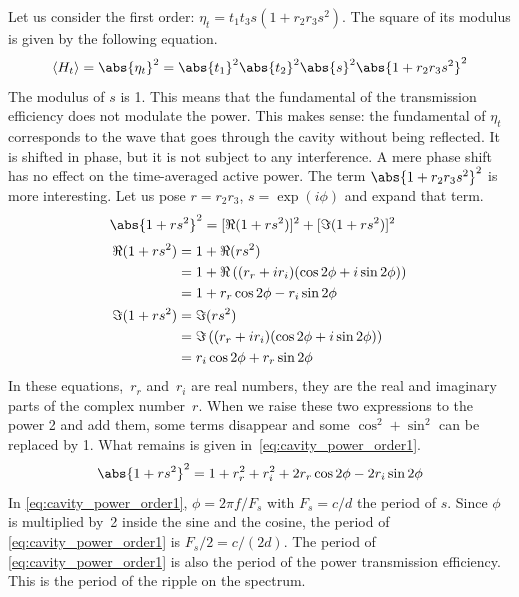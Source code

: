 Let us consider the first order: $\eta_t = t_1 t_3 s (1 + r_2 r_3 s^2)$.
The square of its modulus is given by the following equation.
\begin{equation}
    \langle H_t \rangle =
    \abs{\eta_t}^2 =
    \abs{t_1}^2 \abs{t_2}^2 \abs{s}^2 \abs{1 + r_2 r_3 s^2}^2
    \label{eq:Ht_expanded}
\end{equation}
The modulus of $s$ is 1.
This means that the fundamental of the transmission efficiency does not modulate the power.
This makes sense: the fundamental of $\eta_t$ corresponds to the wave that goes through the cavity without being reflected.
It is shifted in phase, but it is not subject to any interference.
A mere phase shift has no effect on the time-averaged active power.
The term $\abs{1 + r_2 r_3 s^2}^2$ is more interesting.
Let us pose $r=r_2 r_3$, $s=\exp(i\phi)$ and expand that term.
\begin{align}
    \abs{1 + r s^2}^2
    &=
    [\Re(1 + r s^2)]^2 + [\Im(1 + r s^2)]^2
\end{align}
\begin{align}
    \Re(1 + r s^2)
    &=
    1 + \Re(r s^2) \notag
    \\
    &=
    1 + \Re\left(
        (r_r + i r_i) (\cos 2\phi + i\sin 2\phi)
    \right) \notag
    \\
    &= 1 + r_r \cos 2\phi - r_i \sin 2\phi
    \\
    \Im(1 + r s^2)
    &=
    \Im(r s^2) \notag
    \\
    &=
    \Im\left(
        (r_r + i r_i) (\cos 2\phi + i\sin 2\phi)
    \right) \notag
    \\
    &= r_i \cos 2\phi + r_r \sin 2\phi
\end{align}
In these equations,~$r_r$ and~$r_i$ are real numbers, they are the real and imaginary parts of the complex number~$r$.
When we raise these two expressions to the power 2 and add them, some terms disappear and some $\cos^2 + \sin^2$ can be replaced by 1.
What remains is given in~\cref{eq:cavity_power_order1}.
\begin{equation}
     \abs{1 + r s^2}^2
     =
     1 + r_r^2 + r_i^2 + 2 r_r \cos 2\phi - 2 r_i \sin 2\phi
     \label{eq:cavity_power_order1}
\end{equation}
In \cref{eq:cavity_power_order1}, $\phi = 2\pi f/F_s$ with $F_s=c/d$ the period of $s$.
Since $\phi$ is multiplied by~2 inside the sine and the cosine, 
the period of \cref{eq:cavity_power_order1} is $F_s/2 = c/(2d)$.
The period of \cref{eq:cavity_power_order1} is also the period of the power transmission efficiency.
This is the period of the ripple on the spectrum.

